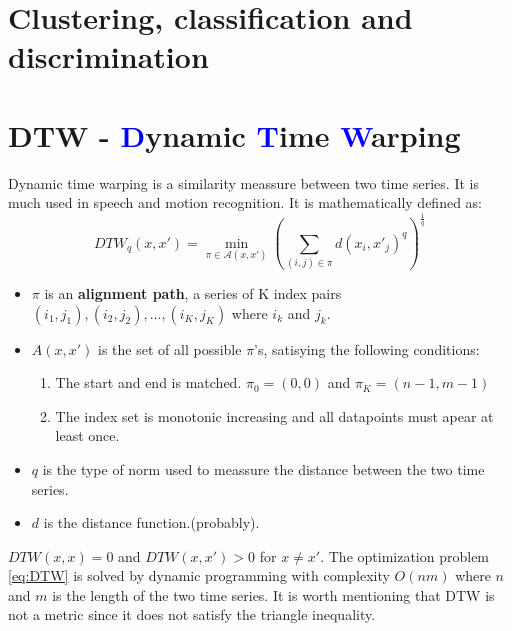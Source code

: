 \section{Clustering, classification and discrimination}

\section{DTW - \textcolor{blue}{D}ynamic \textcolor{blue}{T}ime \textcolor{blue}{W}arping}
Dynamic time warping is a similarity meassure between two time series. It is much used in speech and motion recognition. It is mathematically defined as:
\begin{equation}
DTW_q(x, x') = \min_{\pi \in \mathcal{A}(x, x')} \left( \sum_{(i,j) \in \pi} d(x_i, x'_j)^q \right)^{\frac{1}{q}}
\label{eq:DTW}
\end{equation}
\begin {itemize}
    \item $\pi$ is an \textbf{alignment path}, a series of K index pairs $(i_1, j_1), (i_2, j_2), ..., (i_K, j_K)$ where $i_k$ and $j_k$.
    \item $A(x, x')$ is the set of all possible $\pi$'s, satisying the following conditions:
    \begin{enumerate}
        \item The start and end is matched. $\pi_0 = (0,0)$ and $\pi_K = (n-1, m-1)$
        \item The index set is monotonic increasing and all datapoints must apear at least once.
    \end{enumerate}
    \item $q$ is the type of norm used to meassure the distance between the two time series.
    \item $d$ is the distance function.(probably).
\end{itemize}
$DTW(x,x) = 0$ and $DTW(x,x') > 0$ for $x \neq x'$. \newline
The optimization problem \ref*{eq:DTW} is solved by dynamic programming with complexity $O(nm)$ where $n$ and $m$ is the length of the two time series. \newline
It is worth mentioning that DTW is not a metric since it does not satisfy the triangle inequality. \newline

